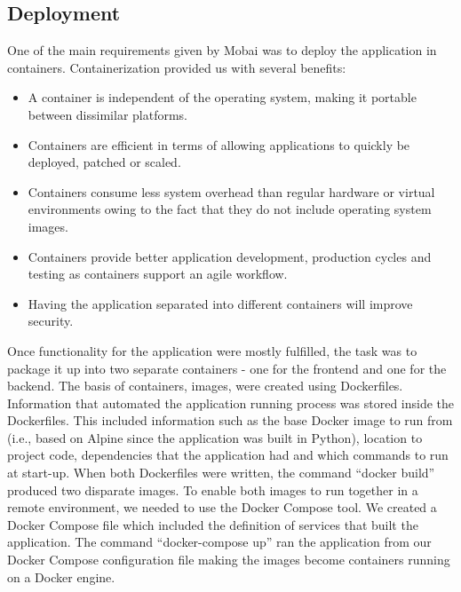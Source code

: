 

\subsection{Deployment}
One of the main requirements given by Mobai was to deploy the application in containers. Containerization \cite{Containerization} provided us with several benefits:
\begin{itemize}
    \item A container is independent of the operating system, making it portable between dissimilar platforms. 
    \item Containers are efficient in terms of allowing applications to quickly be deployed, patched or scaled. 
    \item Containers consume less system overhead than regular hardware or virtual environments owing to the fact that they do not include operating system images. 
    \item Containers provide better application development, production cycles and testing as containers support an agile workflow.
    \item Having the application separated into different containers will improve security. 
\end{itemize}

Once functionality for the application were mostly fulfilled, the task was to package it up into two separate containers - one for the frontend and one for the backend. The basis of containers, images, were created using Dockerfiles. Information that automated the application running process was stored inside the Dockerfiles. This included information such as the base Docker image to run from (i.e., based on Alpine since the application was built in Python), location to project code, dependencies that the application had and which commands to run at start-up. When both Dockerfiles were written, the command ``docker build'' produced two disparate images. To enable both images to run together in a remote environment, we needed to use the Docker Compose tool. We created a Docker Compose file which included the definition of services that built the application. The command ``docker-compose up'' ran the application from our Docker Compose configuration file making the images become containers running on a Docker engine.

